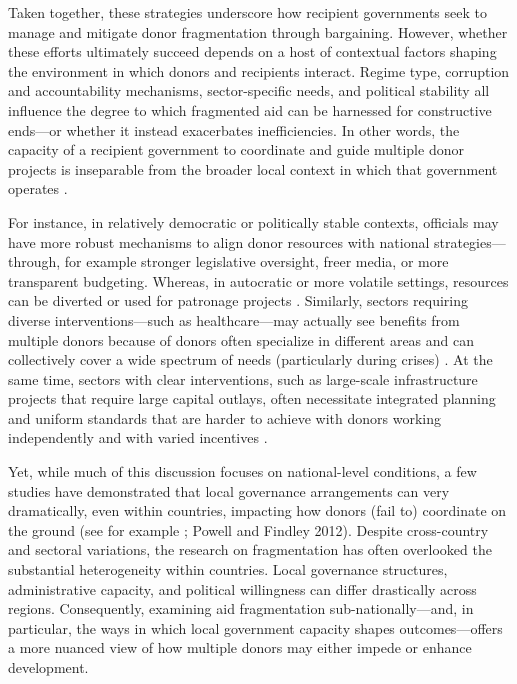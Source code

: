 \documentclass[11pt]{article}
\begin{document}
Taken together, these strategies underscore how recipient governments seek to manage and mitigate donor fragmentation through bargaining. However, whether these efforts ultimately succeed depends on a host of contextual factors shaping the environment in which donors and recipients interact. Regime type, corruption and accountability mechanisms, sector-specific needs, and political stability all influence the degree to which fragmented aid can be harnessed for constructive ends—or whether it instead exacerbates inefficiencies. In other words, the capacity of a recipient government to coordinate and guide multiple donor projects is inseparable from the broader local context in which that government operates \citep{acharya_proliferation_2006, knack_donor_2007, carlitz_harmony_2024}. 

For instance, in relatively democratic or politically stable contexts, officials may have more robust mechanisms to align donor resources with national strategies—through, for example stronger legislative oversight, freer media, or more transparent budgeting. Whereas, in autocratic or more volatile settings, resources can be diverted or used for patronage projects \citep{knack_donor_2007}. Similarly, sectors requiring diverse interventions—such as healthcare—may actually see benefits from multiple donors because of donors often specialize in different areas and can collectively cover a wide spectrum of needs (particularly during crises) \citep{carlitz_harmony_2024}. At the same time, sectors with clear interventions, such as large-scale infrastructure projects that require large capital outlays, often necessitate integrated planning and uniform standards that are harder to achieve with donors working independently and with varied incentives \citep{acharya_proliferation_2006}. 

Yet, while much of this discussion focuses on national-level conditions, a few studies have demonstrated that local governance arrangements can very dramatically, even within countries, impacting how donors (fail to) coordinate on the ground (see for example \cite{faguet_decentralization_2014}; \cite{powell} Powell and Findley 2012). Despite cross-country and sectoral variations, the research on fragmentation has often overlooked the substantial heterogeneity within countries. Local governance structures, administrative capacity, and political willingness can differ drastically across regions. Consequently, examining aid fragmentation sub-nationally—and, in particular, the ways in which local government capacity shapes outcomes—offers a more nuanced view of how multiple donors may either impede or enhance development.
\end{document}
